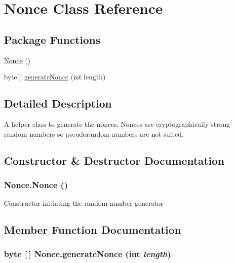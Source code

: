 \hypertarget{class_nonce}{
\section{Nonce Class Reference}
\label{class_nonce}
}
\subsection*{Package Functions}
\begin{CompactItemize}
\item 
\hyperlink{class_nonce_c0}{Nonce} ()
\item 
byte\mbox{[}$\,$\mbox{]} \hyperlink{class_nonce_c1}{generate\-Nonce} (int length)
\end{CompactItemize}


\subsection{Detailed Description}
A helper class to generate the nonces. Nonces are cryptographically strong random numbers so pseudorandom numbers are not suited. 



\subsection{Constructor \& Destructor Documentation}
\hypertarget{class_nonce_c0}{
\subsubsection[Nonce]{\setlength{\rightskip}{0pt plus 5cm}Nonce.Nonce ()}}
\label{class_nonce_c0}


Constructor initiating the random number generator 

\subsection{Member Function Documentation}
\hypertarget{class_nonce_c1}{
\subsubsection[generateNonce]{\setlength{\rightskip}{0pt plus 5cm}byte \mbox{[}$\,$\mbox{]} Nonce.generate\-Nonce (int {\em length})}}
\label{class_nonce_c1}


